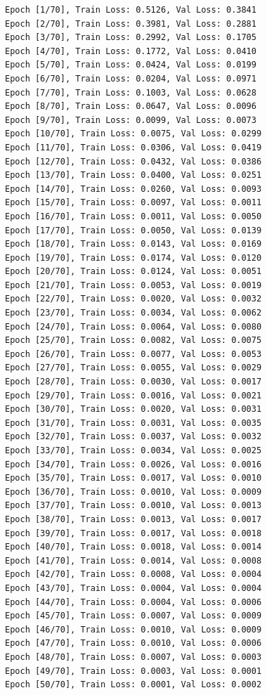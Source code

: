 \begin{lstlisting}
Epoch [1/70], Train Loss: 0.5126, Val Loss: 0.3841
Epoch [2/70], Train Loss: 0.3981, Val Loss: 0.2881
Epoch [3/70], Train Loss: 0.2992, Val Loss: 0.1705
Epoch [4/70], Train Loss: 0.1772, Val Loss: 0.0410
Epoch [5/70], Train Loss: 0.0424, Val Loss: 0.0199
Epoch [6/70], Train Loss: 0.0204, Val Loss: 0.0971
Epoch [7/70], Train Loss: 0.1003, Val Loss: 0.0628
Epoch [8/70], Train Loss: 0.0647, Val Loss: 0.0096
Epoch [9/70], Train Loss: 0.0099, Val Loss: 0.0073
Epoch [10/70], Train Loss: 0.0075, Val Loss: 0.0299
Epoch [11/70], Train Loss: 0.0306, Val Loss: 0.0419
Epoch [12/70], Train Loss: 0.0432, Val Loss: 0.0386
Epoch [13/70], Train Loss: 0.0400, Val Loss: 0.0251
Epoch [14/70], Train Loss: 0.0260, Val Loss: 0.0093
Epoch [15/70], Train Loss: 0.0097, Val Loss: 0.0011
Epoch [16/70], Train Loss: 0.0011, Val Loss: 0.0050
Epoch [17/70], Train Loss: 0.0050, Val Loss: 0.0139
Epoch [18/70], Train Loss: 0.0143, Val Loss: 0.0169
Epoch [19/70], Train Loss: 0.0174, Val Loss: 0.0120
Epoch [20/70], Train Loss: 0.0124, Val Loss: 0.0051
Epoch [21/70], Train Loss: 0.0053, Val Loss: 0.0019
Epoch [22/70], Train Loss: 0.0020, Val Loss: 0.0032
Epoch [23/70], Train Loss: 0.0034, Val Loss: 0.0062
Epoch [24/70], Train Loss: 0.0064, Val Loss: 0.0080
Epoch [25/70], Train Loss: 0.0082, Val Loss: 0.0075
Epoch [26/70], Train Loss: 0.0077, Val Loss: 0.0053
Epoch [27/70], Train Loss: 0.0055, Val Loss: 0.0029
Epoch [28/70], Train Loss: 0.0030, Val Loss: 0.0017
Epoch [29/70], Train Loss: 0.0016, Val Loss: 0.0021
Epoch [30/70], Train Loss: 0.0020, Val Loss: 0.0031
Epoch [31/70], Train Loss: 0.0031, Val Loss: 0.0035
Epoch [32/70], Train Loss: 0.0037, Val Loss: 0.0032
Epoch [33/70], Train Loss: 0.0034, Val Loss: 0.0025
Epoch [34/70], Train Loss: 0.0026, Val Loss: 0.0016
Epoch [35/70], Train Loss: 0.0017, Val Loss: 0.0010
Epoch [36/70], Train Loss: 0.0010, Val Loss: 0.0009
Epoch [37/70], Train Loss: 0.0010, Val Loss: 0.0013
Epoch [38/70], Train Loss: 0.0013, Val Loss: 0.0017
Epoch [39/70], Train Loss: 0.0017, Val Loss: 0.0018
Epoch [40/70], Train Loss: 0.0018, Val Loss: 0.0014
Epoch [41/70], Train Loss: 0.0014, Val Loss: 0.0008
Epoch [42/70], Train Loss: 0.0008, Val Loss: 0.0004
Epoch [43/70], Train Loss: 0.0004, Val Loss: 0.0004
Epoch [44/70], Train Loss: 0.0004, Val Loss: 0.0006
Epoch [45/70], Train Loss: 0.0007, Val Loss: 0.0009
Epoch [46/70], Train Loss: 0.0010, Val Loss: 0.0009
Epoch [47/70], Train Loss: 0.0010, Val Loss: 0.0006
Epoch [48/70], Train Loss: 0.0007, Val Loss: 0.0003
Epoch [49/70], Train Loss: 0.0003, Val Loss: 0.0001
Epoch [50/70], Train Loss: 0.0001, Val Loss: 0.0002

\end{lstlisting}
